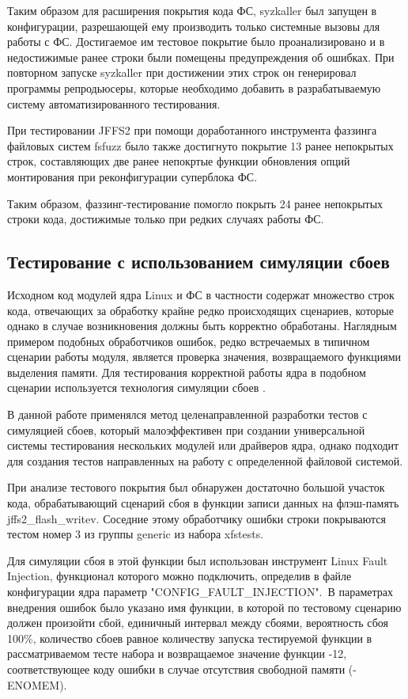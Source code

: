 Таким образом для расширения покрытия кода ФС, syzkaller был запущен в конфигурации, разрешающей ему производить только системные вызовы для работы с ФС. Достигаемое им тестовое покрытие было проанализировано и в недостижимые ранее строки были помещены предупреждения об ошибках. При повторном запуске syzkaller при достижении этих строк он генерировал программы репродьюсеры, которые необходимо добавить в разрабатываемую систему автоматизированного тестирования.

При тестировании JFFS2 при помощи доработанного инструмента фаззинга файловых систем fsfuzz было также достигнуто покрытие 13 ранее непокрытых строк, составляющих две ранее непокртые функции обновления опций монтирования при реконфигурации суперблока ФС.

Таким образом, фаззинг-тестирование помогло покрыть 24 ранее непокрытых строки кода, достижимые только при редких случаях работы ФС.

\subsection{Тестирование с использованием симуляции сбоев}

Исходном код модулей ядра Linux и ФС в частности содержат множество строк кода, отвечающих за обработку крайне редко происходящих сценариев, которые однако в случае возникновения должны быть корректно обработаны. Наглядным примером подобных обработчиков ошибок, редко встречаемых в типичном сценарии работы модуля, является проверка значения, возвращаемого функциями выделения памяти. Для тестирования корректной работы ядра в подобном сценарии используется технология симуляции сбоев \cite{faultuse}.

В данной работе применялся метод целенаправленной разработки тестов с симуляцией сбоев, который малоэффективен при создании универсальной системы тестирования нескольких модулей или драйверов ядра, однако подходит для создания тестов направленных на работу с определенной файловой системой.

При анализе тестового покрытия был обнаружен достаточно большой участок кода, обрабатывающий сценарий сбоя в функции записи данных на флэш-память jffs2\_flash\_writev. Соседние этому обработчику ошибки строки покрываются тестом номер 3 из группы generic из набора xfstests. 

Для симуляции сбоя в этой функции был использован инструмент Linux Fault Injection, функционал которого можно подключить, определив в файле конфигурации ядра параметр "CONFIG\_FAULT\_INJECTION".\ В параметрах внедрения ошибок было указано имя функции, в которой по тестовому сценарию должен произойти сбой, единичный интервал между сбоями, вероятность сбоя 100\%, количество сбоев равное количеству запуска тестируемой функции в рассматриваемом тесте набора и возвращаемое значение функции -12, соответствующее коду ошибки в случае отсутствия свободной памяти (-ENOMEM).

